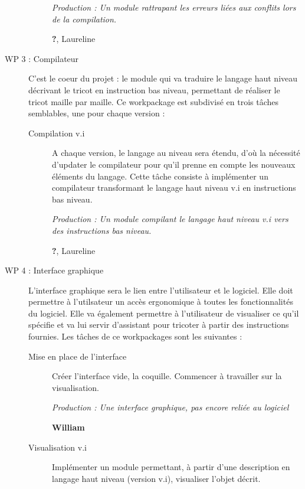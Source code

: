 \documentclass{article}
\begin{document}
\begin{description}
\begin{description}
      \textit{Production : Un module rattrapant les erreurs liées aux conflits lors de la compilation.}

      \textbf{?}, Laureline
    \end{description}

\medskip

\item[WP 3 : Compilateur] C'est le coeur du projet : le module qui va traduire le langage haut niveau décrivant le tricot en instruction bas niveau, permettant de réaliser le tricot maille par maille. Ce workpackage est subdivisé en trois tâches semblables, une pour chaque version :

    \begin{description}
    \item[Compilation v.i] A chaque version, le langage au niveau sera étendu, d'où la nécessité d'updater le compilateur pour qu'il prenne en compte les nouveaux éléments du langage. Cette tâche consiste à implémenter un compilateur transformant le langage haut niveau v.i en instructions bas niveau.

      \textit{Production : Un module compilant le langage haut niveau v.i vers des instructions bas niveau.}

      \textbf{?}, Laureline %
    \end{description}

\medskip

\item[WP 4 : Interface graphique] L'interface graphique sera le lien entre l'utilisateur et le logiciel. Elle doit permettre à l'utilsateur un accès ergonomique à toutes les fonctionnalités du logiciel. Elle va également permettre à l'utilisateur de visualiser ce qu'il spécifie et va lui servir d'assistant pour tricoter à partir des instructions fournies. Les tâches de ce workpackages sont les suivantes :

  \begin{description}
  \item[Mise en place de l'interface] Créer l'interface vide, la coquille. Commencer à travailler sur la visualisation.

    \textit{Production : Une interface graphique, pas encore reliée au logiciel}

    \textbf{William}

  \item[Visualisation v.i] Implémenter un module permettant, à partir d'une description en langage haut niveau (version v.i), visualiser l'objet décrit.


\end{description}
\end{description}
\end{document}
